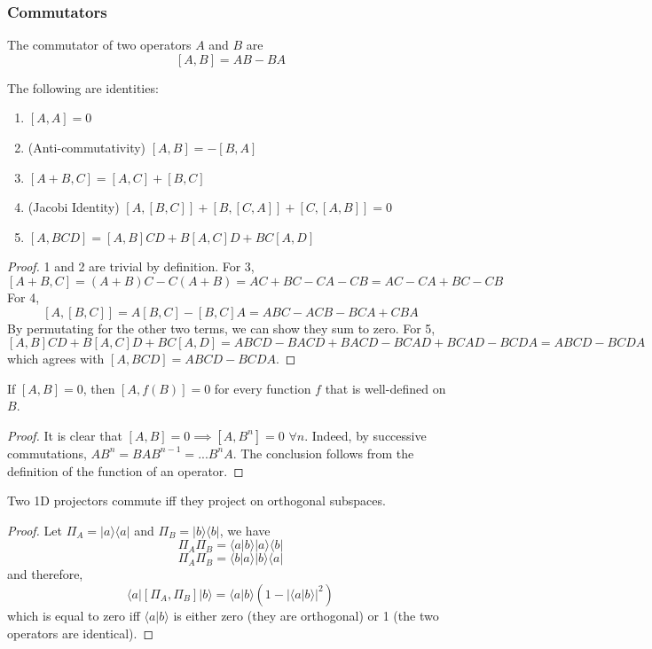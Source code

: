 \documentclass[a4paper]{article}
\begin{document}
\subsubsection*{Commutators}
\begin{defi}[Commutator]
The commutator of two operators $A$ and $B$ are
$$[A,B]=AB-BA$$
\end{defi}
\begin{thm}
The following are identities:
\begin{enumerate}
    \item $[A,A]=0$
    \item (Anti-commutativity) $[A,B]=-[B,A]$
    \item $[A+B,C]=[A,C]+[B,C]$
    \item (Jacobi Identity) $[A,[B,C]]+[B,[C,A]]+[C,[A,B]]=0$
    \item $[A,BCD]=[A,B]CD+B[A,C]D+BC[A,D]$
\end{enumerate}
\end{thm}
\begin{proof}
1 and 2 are trivial by definition. For 3,
$$[A+B,C]=(A+B)C-C(A+B)=AC+BC-CA-CB=AC-CA+BC-CB$$
For 4, 
$$[A,[B,C]]=A[B,C]-[B,C]A=ABC-ACB-BCA+CBA$$
By permutating for the other two terms, we can show they sum to zero. For 5,
$$[A,B]CD+B[A,C]D+BC[A,D]=ABCD-BACD+BACD-BCAD+BCAD-BCDA=ABCD-BCDA$$
which agrees with 
$[A,BCD]=ABCD-BCDA$.
\end{proof}
\begin{thm}\label{functioncommute}
If $[A,B]=0$, then $[A,f(B)]=0$ for every function $f$ that is well-defined on $B$.
\end{thm}
\begin{proof}
It is clear that $[A,B]=0\implies[A,B^n]=0$ $\forall n$. Indeed, by successive commutations, $AB^n=BAB^{n-1}=...B^nA$. The conclusion follows from the definition of the function of an operator.
\end{proof}
\begin{thm}\label{commuteproject}
Two 1D projectors commute iff they project on orthogonal subspaces.
\end{thm}
\begin{proof}
Let $\Pi_A=|a\rangle\langle a|$ and $\Pi_B=|b\rangle\langle b|$, we have
$$\Pi_A\Pi_B=\langle a|b\rangle|a\rangle\langle b|$$
$$\Pi_A\Pi_B=\langle b|a\rangle|b\rangle\langle a|$$
and therefore,
$$\langle a|[\Pi_A,\Pi_B]|b\rangle=\langle a|b\rangle(1-|\langle a|b\rangle|^2)$$
which is equal to zero iff $\langle a|b\rangle$ is either zero (they are orthogonal) or 1 (the two operators are identical).
\end{proof}
\end{document}
